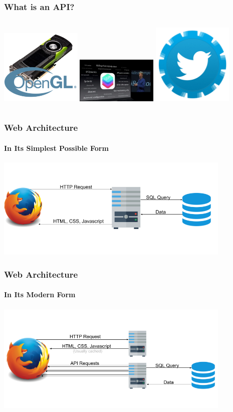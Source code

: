 \documentclass[dvipsnames]{beamer}
\begin{document}
\begin{frame}
  \frametitle{What is an API?}
  \begin{columns}
    \includegraphics[width=110pt]{img/opengl.png}
    \pause
    \includegraphics[width=110pt]{img/ios.jpg}
    \pause
    \includegraphics[width=110pt]{img/twitter.png}
  \end{columns}
\end{frame}


\begin{frame}
  \frametitle{Web Architecture}
  \framesubtitle{In Its Simplest Possible Form}
  \includegraphics[width=320pt]{img/web-architecture-1.png}
\end{frame}


\begin{frame}
  \frametitle{Web Architecture}
  \framesubtitle{In Its Modern Form}
  \includegraphics[width=320pt]{img/web-architecture-2.png}
\end{frame}
\end{document}
